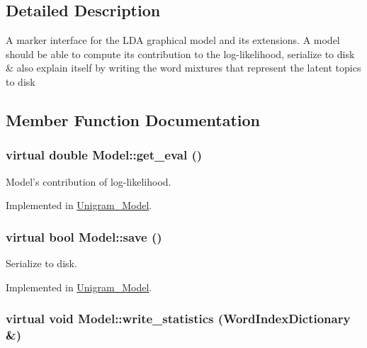 \subsection{Detailed Description}
A marker interface for the LDA graphical model and its extensions. A model should be able to compute its contribution to the log-\/likelihood, serialize to disk \& also explain itself by writing the word mixtures that represent the latent topics to disk 

\subsection{Member Function Documentation}
\hypertarget{class_model_a36d3376040155630afbfcbdc3160c839}{
\subsubsection[{get\_\-eval}]{\setlength{\rightskip}{0pt plus 5cm}virtual double Model::get\_\-eval ()}}
\label{class_model_a36d3376040155630afbfcbdc3160c839}


Model's contribution of log-\/likelihood. 



Implemented in \hyperlink{class_unigram___model_a68837b7da897fc7ce834df31d6930281}{Unigram\_\-Model}.

\hypertarget{class_model_a9eb67634d1cbfbbe5758571e230834d4}{
\subsubsection[{save}]{\setlength{\rightskip}{0pt plus 5cm}virtual bool Model::save ()}}
\label{class_model_a9eb67634d1cbfbbe5758571e230834d4}


Serialize to disk. 



Implemented in \hyperlink{class_unigram___model_a8ca0b95bc57583f70035825f1f950314}{Unigram\_\-Model}.

\hypertarget{class_model_a166812818e0039417ddeeb661c8bafec}{
\subsubsection[{write\_\-statistics}]{\setlength{\rightskip}{0pt plus 5cm}virtual void Model::write\_\-statistics ({\bf WordIndexDictionary} \&)}}
\label{class_model_a166812818e0039417ddeeb661c8bafec}



